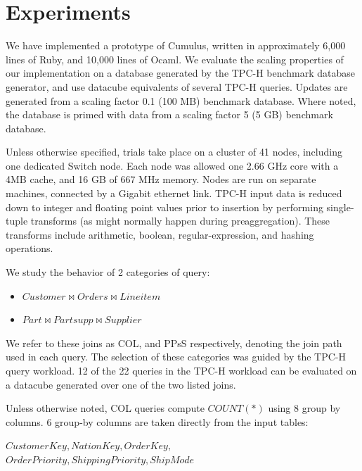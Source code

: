 
\section{Experiments}
\label{sec:experiments}

We have implemented a prototype of Cumulus, written in approximately 6,000 lines of Ruby, and 10,000 lines of Ocaml.  We evaluate the scaling properties of our implementation on a database generated by the TPC-H benchmark database generator, and use datacube equivalents of several TPC-H queries.  Updates are generated from a scaling factor 0.1 (100 MB) benchmark database.  Where noted, the database is primed with data from a scaling factor 5 (5 GB) benchmark database.

Unless otherwise specified, trials take place on a cluster of 41 nodes, including one dedicated Switch node.  Each node was allowed one 2.66 GHz core with a 4MB cache, and 16 GB of 667 MHz memory.  Nodes are run on separate machines, connected by a Gigabit ethernet link.  TPC-H input data is reduced down to integer and floating point values prior to insertion by performing single-tuple transforms (as might normally happen during preaggregation).  These transforms include arithmetic, boolean, regular-expression, and hashing operations.

We study the behavior of 2 categories of query: 
\begin{itemize}
\item $Customer \bowtie Orders \bowtie Lineitem$
\item $Part \bowtie Partsupp \bowtie Supplier$
\end{itemize}
We refer to these joins as COL, and PPsS respectively, denoting the join path used in each query.  The selection of these categories was guided by the TPC-H query workload.  12 of the 22 queries in the TPC-H workload can be evaluated on a datacube generated over one of the two listed joins.  

Unless otherwise noted, COL queries compute $COUNT(*)$ using 8 group by columns.  6 group-by columns are taken directly from the input tables: 

{\noindent $CustomerKey, NationKey, OrderKey,$ \\
$OrderPriority, ShippingPriority, ShipMode$}


